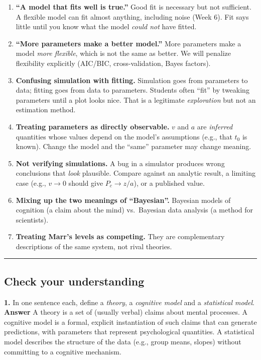 \begin{enumerate}
\def\labelenumi{\arabic{enumi}.}
\tightlist
\item
  \textbf{``A model that fits well is true.''} Good fit is necessary but
  not sufficient. A flexible model can fit almost anything, including
  noise (Week 6). Fit says little until you know what the model
  \emph{could not} have fitted.
\item
  \textbf{``More parameters make a better model.''} More parameters make
  a model \emph{more flexible}, which is not the same as better. We will
  penalize flexibility explicitly (AIC/BIC, cross-validation, Bayes
  factors).
\item
  \textbf{Confusing simulation with fitting.} Simulation goes from
  parameters to data; fitting goes from data to parameters. Students
  often ``fit'' by tweaking parameters until a plot looks nice. That is
  a legitimate \emph{exploration} but not an estimation method.
\item
  \textbf{Treating parameters as directly observable.} \(v\) and \(a\)
  are \emph{inferred} quantities whose values depend on the model's
  assumptions (e.g., that \(t_0\) is known). Change the model and the
  ``same'' parameter may change meaning.
\item
  \textbf{Not verifying simulations.} A bug in a simulator produces
  wrong conclusions that \emph{look} plausible. Compare against an
  analytic result, a limiting case (e.g., \(v \to 0\) should give
  \(P_c \to z/a\)), or a published value.
\item
  \textbf{Mixing up the two meanings of ``Bayesian''.} Bayesian models
  of cognition (a claim about the mind) vs.~Bayesian data analysis (a
  method for scientists).
\item
  \textbf{Treating Marr's levels as competing.} They are complementary
  descriptions of the same system, not rival theories.
\end{enumerate}

\begin{center}\rule{0.5\linewidth}{0.5pt}\end{center}

\subsection{Check your understanding}

\textbf{1.} In one sentence each, define a \emph{theory}, a
\emph{cognitive model} and a \emph{statistical model}. \textbf{Answer} A
theory is a set of (usually verbal) claims about mental processes. A
cognitive model is a formal, explicit instantiation of such claims that
can generate predictions, with parameters that represent psychological
quantities. A statistical model describes the structure of the data
(e.g., group means, slopes) without committing to a cognitive mechanism.

